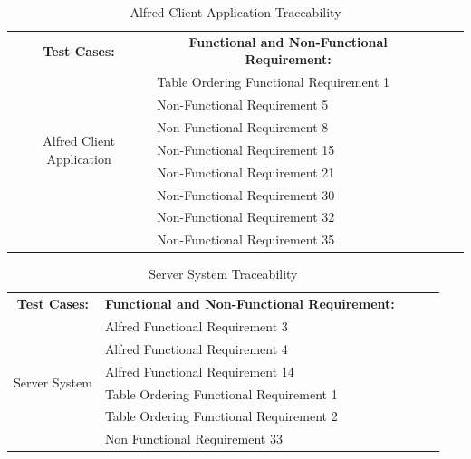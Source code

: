 \documentclass [10pt]{article}
\begin{document}
\begin{table}[h!]
\centering
\begin{tabular}{lllll}
\cline{1-2}
\multicolumn{1}{|c|}{\textbf{Test Cases:}} & \multicolumn{1}{c|}{\textbf{Functional and Non-Functional Requirement:}} &  &  &  \\ \cline{1-2}
\multicolumn{1}{|c|}{\multirow{7}{*}{Alfred Client Application}} & \multicolumn{1}{l|}{Table Ordering Functional Requirement 1} &  &  &  \\ \cline{2-2}
\multicolumn{1}{|c|}{} & \multicolumn{1}{l|}{Non-Functional Requirement 5} &  &  &  \\ \cline{2-2}
\multicolumn{1}{|c|}{} & \multicolumn{1}{l|}{Non-Functional Requirement 8} &  &  &  \\ \cline{2-2}
\multicolumn{1}{|c|}{} & \multicolumn{1}{l|}{Non-Functional Requirement 15} &  &  &  \\ \cline{2-2}
\multicolumn{1}{|c|}{} & \multicolumn{1}{l|}{Non-Functional Requirement 21} &  &  &  \\ \cline{2-2}
\multicolumn{1}{|c|}{} & \multicolumn{1}{l|}{Non-Functional Requirement 30} &  &  &  \\ \cline{2-2}
\multicolumn{1}{|c|}{} & \multicolumn{1}{l|}{Non-Functional Requirement 32} &  &  &  \\ \cline{2-2}
\multicolumn{1}{|c|}{} & \multicolumn{1}{l|}{Non-Functional Requirement 35} &  &  &  \\ \cline{1-2}
\end{tabular}
\caption{Alfred Client Application Traceability}
\end{table}


\begin{table}[h!]
\centering
\begin{tabular}{lllll}
\cline{1-2}
\multicolumn{1}{|c|}{\textbf{Test Cases:}} & \multicolumn{1}{c|}{\textbf{Functional and Non-Functional Requirement:}} &  &  &  \\ \cline{1-2}
\multicolumn{1}{|c|}{\multirow{6}{*}{Server System}} & \multicolumn{1}{l|}{Alfred Functional Requirement 3} &  &  &  \\ \cline{2-2}
\multicolumn{1}{|c|}{} & \multicolumn{1}{l|}{Alfred Functional Requirement 4} &  &  &  \\ \cline{2-2}
\multicolumn{1}{|c|}{} & \multicolumn{1}{l|}{Alfred Functional Requirement 14} &  &  &  \\ \cline{2-2}
\multicolumn{1}{|c|}{} & \multicolumn{1}{l|}{Table Ordering Functional Requirement 1} &  &  &  \\ \cline{2-2}
\multicolumn{1}{|c|}{} & \multicolumn{1}{l|}{Table Ordering Functional Requirement 2} &  &  &  \\ \cline{2-2}
\multicolumn{1}{|c|}{} & \multicolumn{1}{l|}{Non Functional Requirement 33} &  &  &  \\ \cline{1-2}
\end{tabular}
\caption{Server System Traceability}
\end{table}
\end{document}
